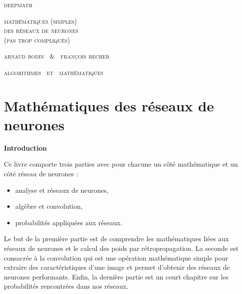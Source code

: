 
\pagestyle{empty}\thispagestyle{empty}
\vspace*{\fill}
\vspace*{5ex}
\begin{center}
	\fontsize{40}{40}\selectfont
	\textsc{deepmath}
	
	\vspace*{1ex}
	\textsc{\fontsize{24}{24}\selectfont 
	mathématiques (simples) \\
	des réseaux de neurones \\[-18pt]
	(pas trop compliqués)
	}
	
	\vspace*{2ex}
	
	\Large
	\textsc{arnaud bodin \ \& \ françois recher}

\end{center}
\vfill
\begin{center}
	\Large
	\textsc{algorithmes \  et \  mathématiques}
\end{center}
\begin{center}
\end{center}

\clearemptydoublepage

\thispagestyle{empty}

\vspace*{\fill}
\section*{Mathématiques des réseaux de neurones}

{\large\textbf{Introduction}}

Ce livre comporte trois parties avec pour chacune un côté \og{} mathématique\fg{} et un côté \og{} réseau de neurones\fg{} :
\begin{itemize}
  \item analyse et réseaux de neurones,
  \item algèbre et convolution,
  \item probabilités appliquées aux réseaux.
\end{itemize}

Le but de la première partie est de comprendre les mathématiques liées aux réseaux de neurones et le calcul des poids par rétropropagation. La seconde est consacrée à la convolution qui est une opération mathématique simple pour extraire des caractéristiques d'une image et permet d'obtenir des réseaux de neurones performants. Enfin, la dernière partie est un court chapitre sur les probabilités rencontrées dans nos réseaux.

